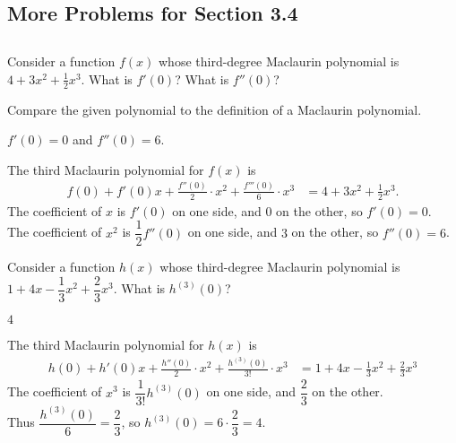 %
%
\subsection*{More Problems for Section 3.4}
\subsection*{\Conceptual}


\begin{question}[2015Q]
Consider a function $f(x)$ whose third-degree Maclaurin polynomial is $4 +
3x^2 + \frac{1}{2}x^3$.
 What is $f'(0)$? What is $f''(0)$?
\end{question}
\begin{hint} Compare the given polynomial to the definition of a Maclaurin polynomial.
\end{hint}
\begin{answer} $f'(0)=0$ and $f''(0)=6$.
\end{answer}
\begin{solution}
The third Maclaurin polynomial for $f(x)$ is
\begin{align*}
f(0) + f'(0)x +\frac{f''(0)}{2}\cdot x^2 + \frac{f'''(0)}{6}\cdot x^3
&=4+3x^2+\frac{1}{2}x^3.
\end{align*}
The coefficient of $x$ is $f'(0)$ on  one side, and $0$ on the other, so
 $f'(0)=0$.\\
 The coefficient of $x^2$ is $\dfrac{1}{2}f''(0)$ on  one side, and $3$ on the other, so
 $f''(0)=6$.
\end{solution}


\begin{question}[2015Q]
Consider a function $h(x)$ whose third-degree Maclaurin polynomial is
$1+4x-\dfrac{1}{3}x^2 + \dfrac{2}{3}x^3$. What is $h^{(3)}(0)$?
\end{question}
\begin{answer}
$4$
\end{answer}
\begin{solution}
The third Maclaurin polynomial for $h(x)$ is
\begin{align*}
    h(0) + h'(0)x +\frac{h''(0)}{2}\cdot x^2 + \frac{h^{(3)}(0)}{3!}\cdot x^3
    &= 1+4x-\frac{1}{3}x^2 + \frac{2}{3}x^3
\end{align*}
 The coefficient of $x^3$ is $\dfrac{1}{3!}h^{(3)}(0)$ on  one side, and $\dfrac{2}{3}$ on the other. \\ Thus $ \dfrac{h^{(3)}(0)}{6}=\dfrac{2}{3}$, so $h^{(3)}(0)=6\cdot\dfrac{2}{3} = 4$.
\end{solution}




